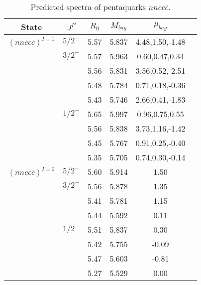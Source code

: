 \documentclass[prd,twocolumn,floatfix,nofootinbib]{revtex4}
\begin{document}
\begin{table*}[!htbp]
    \caption{Predicted spectra of pentaquarks $nncc\bar{c}$.}
    \begin{tabular}{cccccc}
        \hline\hline
        {\rm State} &$J^{P}$ &$R_{0}$ &$M_{bag}$ &$\mu_{bag}$  \\ \hline
        ${(nncc\bar{c})}^{I=1}$
            &${5/2}^{-}$     &5.57   &5.837 &4.48,1.50,-1.48  \\                
            &${3/2}^{-}$     &5.57   &5.963 &0.60,0.47,0.34 \\
                         &$ $     &5.56   &5.831 &3.56,0.52,-2.51  \\
                         &$ $     &5.48   &5.784 &0.71,0.18,-0.36  \\
                         &$ $     &5.43   &5.746 &2.66,0.41,-1.83 \\
            &${1/2}^{-}$     &5.65   &5.997 &0.96,0.75,0.55  \\
                         &$ $     &5.56   &5.838 &3.73,1.16,-1.42  \\
                         &$ $     &5.45   &5.767 &0.91,0.25,-0.40  \\
                         &$ $     &5.35   &5.705 &0.74,0.30,-0.14 \\
            ${(nncc\bar{c})}^{I=0}$
            &${5/2}^{-}$     &5.60   &5.914 &1.50  \\                
            &${3/2}^{-}$     &5.56   &5.878 &1.35 \\
                         &$ $     &5.41   &5.781 &1.15  \\
                         &$ $     &5.44   &5.592 &0.11  \\
            &${1/2}^{-}$     &5.51   &5.837 &0.30  \\
                         &$ $     &5.42   &5.755 &-0.09  \\
                         &$ $     &5.47   &5.603 &-0.81  \\
                         &$ $     &5.27   &5.529 &0.00 \\
       \hline\hline
    \end{tabular}
\end{table*}
\end{document}
